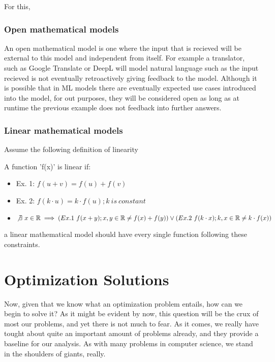 \documentclass{textbook}
\begin{document}
For this, 

\subsection{Open mathematical models}

An open mathematical model is one where the input that is recieved will be external to this model and
independent from itself. For example a translator, such as Google Translate or DeepL will model natural language
such as the input recieved is not eventually retroactively giving feedback to the model. Although it is possible that
in ML models there are eventually expected use cases introduced into the model, for out purposes, they will be considered 
open as long as at runtime the previous example does not feedback into further answers.

\subsection{Linear mathematical models}

Assume the following definition of linearity

A function 'f(x)' is linear if:
\begin{itemize}
    \item Ex. 1: $f(u+v) = f(u) + f(v)$
    \item Ex. 2: $f(k \cdot u) = k \cdot f(u) ; k \ is \ constant$
    \item $\not \exists \ x \in \mathbb{R}  \implies (Ex. 1 \ f(x+y); x,y \in \mathbb{R} \neq f(x) +f(y)) \lor (Ex. 2 \ f(k \cdot x); k, x \in \mathbb{R} \neq k \cdot f(x)) $
\end{itemize}

a linear mathematical model should have every single function following these constraints. 


\chapter{Optimization Solutions}

Now, given that we know what an optimization problem entails, how can we begin
to solve it? As it might be evident by now, this question will be the crux of most our
problems, and yet there is not much to fear. As it comes, we really have tought about quite an
important amount of problems already, and they provide a baseline for our analysis. As with
many problems in computer science, we stand in the shoulders of giants, really.
\end{document}

